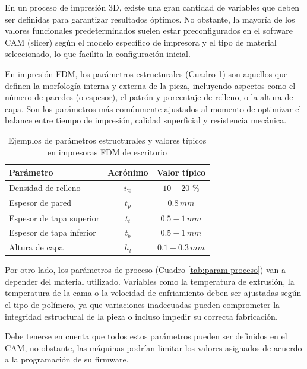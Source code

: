 En un proceso de impresión 3D, existe una gran cantidad de variables que deben ser definidas para garantizar resultados óptimos. No obstante, la mayoría de los valores funcionales predeterminados suelen estar preconfigurados en el software CAM (slicer) según el modelo específico de impresora y el tipo de material seleccionado, lo que facilita la configuración inicial.

En impresión FDM, los parámetros estructurales (Cuadro \ref{tab:param-estructurales}) son aquellos que definen la morfología interna y externa de la pieza, incluyendo aspectos como el número de paredes (o espesor), el patrón y porcentaje de relleno, o la altura de capa. Son los parámetros más comúnmente ajustados al momento de optimizar el balance entre tiempo de impresión, calidad superficial y resistencia mecánica.

\begin{table}[ht]
  \centering
  \caption{Ejemplos de parámetros estructurales y valores típicos en impresoras FDM de escritorio}
  \label{tab:param-estructurales}
  \begin{tabular}{@{} l c c @{}}
    \toprule
    Parámetro                   & Acrónimo       & Valor típico     \\
    \midrule
    Densidad de relleno        & $i_{\%}$     &     $\mathrm{10-20}$ $\%$\\
    Espesor de pared            & $t_{p}$        &   $\mathrm{0.8}\,mm$  \\
    Espesor de tapa superior          & $t_{t}$ & $\mathrm{0.5-1}\,mm$\\
    Espesor de tapa inferior            & $t_{b}$ & $\mathrm{0.5-1}\, mm$\\
    Altura de capa           & $h_{l}$            &  $\mathrm{0.1-0.3}\, mm$    \\
    \bottomrule
  \end{tabular}
\end{table}

Por otro lado, los parámetros de proceso (Cuadro \ref{tab:param-proceso}) van a depender del material utilizado. Variables como la temperatura de extrusión, la temperatura de la cama o la velocidad de enfriamiento deben ser ajustadas según el tipo de polímero, ya que variaciones inadecuadas pueden comprometer la integridad estructural de la pieza o incluso impedir su correcta fabricación.


Debe tenerse en cuenta que todos estos parámetros pueden ser definidos en el CAM, no obstante, las máquinas podrían limitar los valores asignados de acuerdo a la programación de su firmware.


